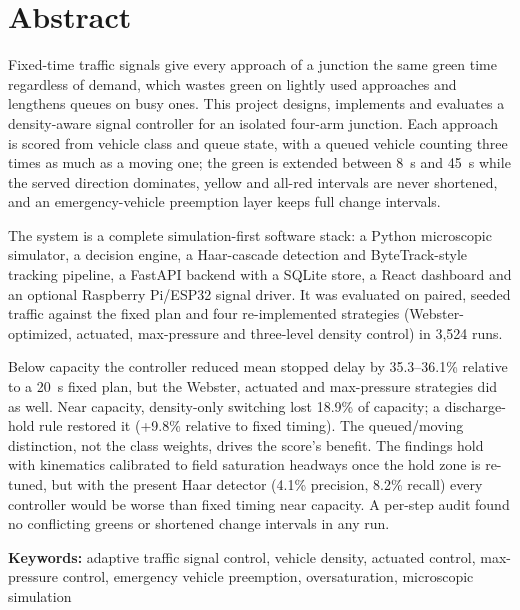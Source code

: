 \chapter*{Abstract}

Fixed-time traffic signals give every approach of a junction the same green time regardless of demand, which wastes green on lightly used approaches and lengthens queues on busy ones. This project designs, implements and evaluates a density-aware signal controller for an isolated four-arm junction. Each approach is scored from vehicle class and queue state, with a queued vehicle counting three times as much as a moving one; the green is extended between 8~s and 45~s while the served direction dominates, yellow and all-red intervals are never shortened, and an emergency-vehicle preemption layer keeps full change intervals.

The system is a complete simulation-first software stack: a Python microscopic simulator, a decision engine, a Haar-cascade detection and ByteTrack-style tracking pipeline, a FastAPI backend with a SQLite store, a React dashboard and an optional Raspberry Pi/ESP32 signal driver. It was evaluated on paired, seeded traffic against the fixed plan and four re-implemented strategies (Webster-optimized, actuated, max-pressure and three-level density control) in 3,524 runs.

Below capacity the controller reduced mean stopped delay by 35.3--36.1\% relative to a 20~s fixed plan, but the Webster, actuated and max-pressure strategies did as well. Near capacity, density-only switching lost 18.9\% of capacity; a discharge-hold rule restored it (+9.8\% relative to fixed timing). The queued/moving distinction, not the class weights, drives the score's benefit. The findings hold with kinematics calibrated to field saturation headways once the hold zone is re-tuned, but with the present Haar detector (4.1\% precision, 8.2\% recall) every controller would be worse than fixed timing near capacity. A per-step audit found no conflicting greens or shortened change intervals in any run.

\vspace{0.8cm}
\noindent\textbf{Keywords:} adaptive traffic signal control, vehicle density, actuated control, max-pressure control, emergency vehicle preemption, oversaturation, microscopic simulation
